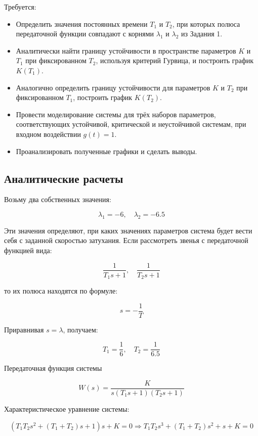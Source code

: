 \documentclass[a4paper,12pt]{article}
\begin{document}
		Требуется:
		
		\begin{itemize}
			\item Определить значения постоянных времени \(T_1\) и \(T_2\), при которых полюса передаточной функции совпадают с корнями \(\lambda_1\) и \(\lambda_2\) из Задания 1.
			\item Аналитически найти границу устойчивости в пространстве параметров \(K\) и \(T_1\) при фиксированном \(T_2\), используя критерий Гурвица, и построить график \(K(T_1)\).
			\item Аналогично определить границу устойчивости для параметров \(K\) и \(T_2\) при фиксированном \(T_1\), построить график \(K(T_2)\).
			\item Провести моделирование системы для трёх наборов параметров, соответствующих устойчивой, критической и неустойчивой системам, при входном воздействии \(g(t) = 1\).
			\item Проанализировать полученные графики и сделать выводы.
		\end{itemize}
		\subsection{Аналитические расчеты}
		
	 	Возьму два собственных значения:
		
		\[
		\lambda_1 = -6, \quad \lambda_2 = -6.5
		\]
		
		Эти значения определяют, при каких значениях параметров система будет вести себя с заданной скоростью затухания. Если рассмотреть звенья с передаточной функцией вида:
		
		\[
		\frac{1}{T_1 s + 1}, \quad \frac{1}{T_2 s + 1}
		\]
		
		то их полюса находятся по формуле:
		
		\[
		s = -\frac{1}{T}
		\]
		
		Приравнивая \( s = \lambda \), получаем:
		
		\[
		T_1 = \frac{1}{6}, \quad T_2 = \frac{1}{6.5}\]
		
		Передаточная функция системы
		
		\[
		W(s) = \frac{K}{s (T_1 s + 1)(T_2 s + 1)}
		\]
		
		
		
		
		Характеристическое уравнение системы:
		
		\[
		(T_1 T_2 s^2 + (T_1 + T_2)s + 1)s + K = 0
		\Rightarrow T_1 T_2 s^3 + (T_1 + T_2) s^2 + s + K = 0
		\]
		
\end{document}
